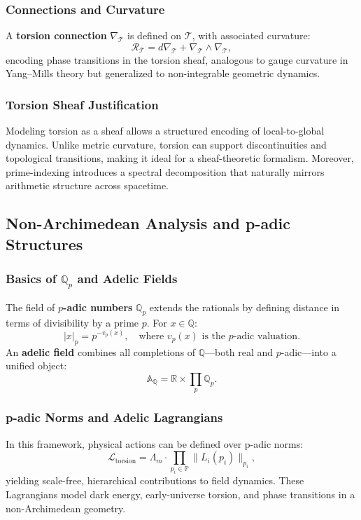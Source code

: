 \documentclass{article}
\theoremstyle{plain}
\begin{document}
\subsubsection*{Connections and Curvature}
A \textbf{torsion connection} $\nabla_{\mathcal{T}}$ is defined on $\mathcal{T}$, with associated curvature:
\[
\mathcal{R}_{\mathcal{T}} = d\nabla_{\mathcal{T}} + \nabla_{\mathcal{T}} \wedge \nabla_{\mathcal{T}},
\]
encoding phase transitions in the torsion sheaf, analogous to gauge curvature in Yang–Mills theory but generalized to non-integrable geometric dynamics.

\subsubsection*{Torsion Sheaf Justification}
Modeling torsion as a sheaf allows a structured encoding of local-to-global dynamics. Unlike metric curvature, torsion can support discontinuities and topological transitions, making it ideal for a sheaf-theoretic formalism. Moreover, prime-indexing introduces a spectral decomposition that naturally mirrors arithmetic structure across spacetime.

\subsection{Non-Archimedean Analysis and p-adic Structures}

\subsubsection*{Basics of $\mathbb{Q}_p$ and Adelic Fields}
The field of \textbf{$p$-adic numbers} $\mathbb{Q}_p$ extends the rationals by defining distance in terms of divisibility by a prime $p$. For $x \in \mathbb{Q}$:
\[
|x|_p = p^{-v_p(x)}, \quad \text{where } v_p(x) \text{ is the $p$-adic valuation}.
\]
An \textbf{adelic field} combines all completions of $\mathbb{Q}$—both real and $p$-adic—into a unified object:
\[
\mathbb{A}_\mathbb{Q} = \mathbb{R} \times \prod_{p} \mathbb{Q}_p.
\]

\subsubsection*{p-adic Norms and Adelic Lagrangians}
In this framework, physical actions can be defined over p-adic norms:
\[
\mathcal{L}_{\text{torsion}} = \Lambda_m \cdot \prod_{p_i \in \mathbb{P}} \|L_i(p_i)\|_{p_i},
\]
yielding scale-free, hierarchical contributions to field dynamics. These Lagrangians model dark energy, early-universe torsion, and phase transitions in a non-Archimedean geometry.
\end{document}
